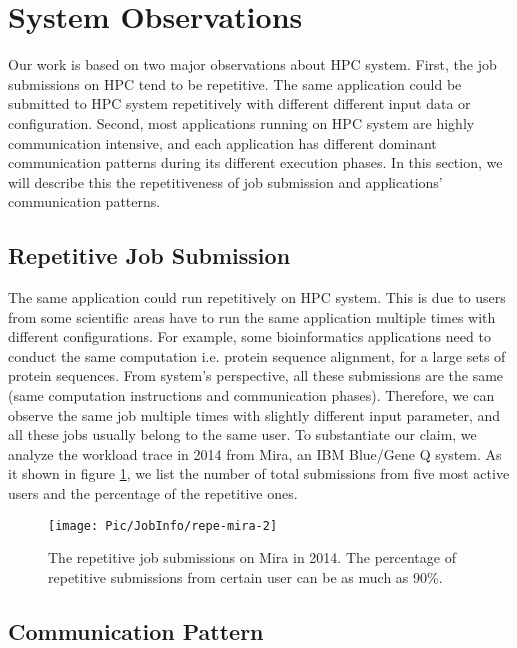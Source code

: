 \documentclass[conference]{IEEEtran}
\begin{document}
\section{System Observations}
\label{sec: observation}

Our work is based on two major observations about HPC system. First, the job submissions on HPC tend to be repetitive. The same application could be submitted to HPC system repetitively with different different input data or configuration. Second, most applications running on HPC system are highly communication intensive, and each application has different dominant communication patterns during its different execution phases. In this section, we will describe this the repetitiveness of job submission and applications' communication patterns.

\subsection{Repetitive Job Submission}
\label{sec: repetitive job submission}

The same application could run repetitively on HPC system. This is due to users from some scientific areas have to run the same application multiple times with different configurations. For example, some bioinformatics applications need to conduct the same computation i.e. protein sequence alignment, for a large sets of protein sequences. From system's perspective, all these submissions are the same (same computation instructions and communication phases). Therefore, we can observe the same job multiple times with slightly different input parameter, and all these jobs usually belong to the same user. To substantiate our claim, we analyze the workload trace in 2014 from Mira, an IBM Blue/Gene Q system. As it shown in figure \ref{fig: repetitiveness of Mira},  we list the number of total submissions from five most active users and the percentage of the repetitive ones.


\begin{figure}[h!] 
  \centering
  \texttt{[image: Pic/JobInfo/repe-mira-2]}
   \caption{ The repetitive job submissions on Mira in 2014. The percentage of repetitive submissions from certain user can be as much as 90\%. }
   \label{fig: repetitiveness of Mira}
\end{figure}



\subsection{Communication Pattern}
\label{sec:communication pattern matrix}
\end{document}
